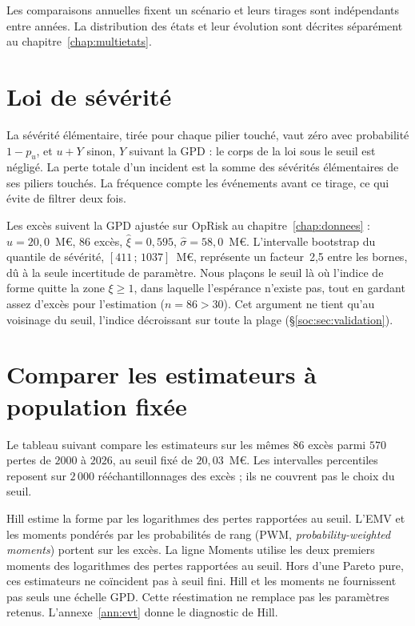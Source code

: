 Les comparaisons annuelles fixent un scénario et leurs tirages sont indépendants entre années.
La distribution des états et leur évolution sont décrites séparément au chapitre~\ref{chap:multietats}.

\section{Loi de sévérité}
\label{soc:sec:severite}

La sévérité élémentaire, tirée pour chaque pilier touché, vaut zéro avec probabilité $1-p_u$, et $u+Y$ sinon, $Y$ suivant la GPD : le corps de la loi sous le seuil est négligé. La perte totale d'un incident est la somme des sévérités élémentaires de ses piliers touchés. La fréquence compte les événements avant ce tirage, ce qui évite de filtrer deux fois.


Les excès suivent la GPD ajustée sur OpRisk au chapitre~\ref{chap:donnees} :
$u = 20{,}0$~M\euro, $86$ excès, $\hat\xi = 0{,}595$, $\hat\sigma = 58{,}0$~M\euro. L'intervalle bootstrap du
quantile de sévérité, $[411\,;\,1037]$~M\euro, représente un facteur~2{,}5
entre les bornes, dû à la seule incertitude de paramètre. Nous plaçons le seuil là où l'indice de
forme quitte la zone $\xi \geq 1$, dans laquelle l'espérance n'existe pas, tout en gardant assez
d'excès pour l'estimation ($n = 86 > 30$). Cet argument ne tient qu'au voisinage du seuil, l'indice
décroissant sur toute la plage (\S\ref{soc:sec:validation}).

\section{Comparer les estimateurs à population fixée}

Le tableau suivant compare les estimateurs sur les mêmes $86$ excès parmi
$570$ pertes de $2000$ à $2026$, au seuil fixé de $20{,}03$~M\euro. Les intervalles percentiles
reposent sur $2\,000$ rééchantillonnages des excès ; ils ne couvrent pas le choix du seuil.

Hill estime la forme par les logarithmes des pertes rapportées au seuil. L'EMV et les moments pondérés par les probabilités de rang (PWM, \emph{probability-weighted moments}) portent
sur les excès. La ligne Moments utilise les deux premiers moments des logarithmes des pertes
rapportées au seuil. Hors d'une Pareto pure, ces estimateurs ne coïncident pas à seuil fini. Hill et les moments
ne fournissent pas seuls une échelle GPD. Cette réestimation ne remplace pas les paramètres retenus.
L'annexe~\ref{ann:evt} donne le diagnostic de Hill.

